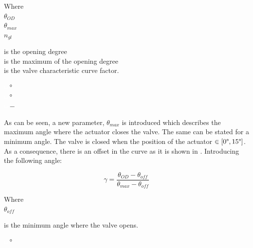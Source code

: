  \begin{minipage}[t]{0.20\textwidth}
Where\\
\hspace*{8mm} $\theta_{OD}$ \\
\hspace*{8mm} $\theta_{max}$ \\
\hspace*{8mm} $n_{gl}$ 
\end{minipage}
\begin{minipage}[t]{0.68\textwidth}
\vspace*{2mm}
is the opening degree\\ 
is the maximum of the opening degree\\
is the valve characteristic curve factor.

\end{minipage}
\begin{minipage}[t]{0.10\textwidth}
\vspace*{2mm}
\textcolor{White}{te}$\unit{\degree}$\\
\textcolor{White}{te}$\unit{\degree}$\\
\textcolor{White}{te}$\unit{-}$
\end{minipage}	

As can be seen, a new parameter, $\theta_{max}$ is introduced which describes the maximum angle where the actuator closes the valve. The same can be stated for a minimum angle. The valve is closed when the position of the actuator $\in [0\degree,15\degree]$. As a consequence, there is an offset in the curve as it is shown in . Introducing the following angle:

\begin{equation}
\label{ValveAngle}
 \gamma =  \frac{\theta_{OD}-\theta_{off}}{\theta_{max}-\theta_{off}}
\end{equation}

  \begin{minipage}[t]{0.20\textwidth}
Where\\
\hspace*{8mm} $\theta_{off}$ 
\end{minipage}
\begin{minipage}[t]{0.68\textwidth}
\vspace*{2mm}
is the minimum angle where the valve opens.

\end{minipage}
\begin{minipage}[t]{0.10\textwidth}
\vspace*{2mm}
\textcolor{White}{te}$\unit{\degree}$
\end{minipage}

